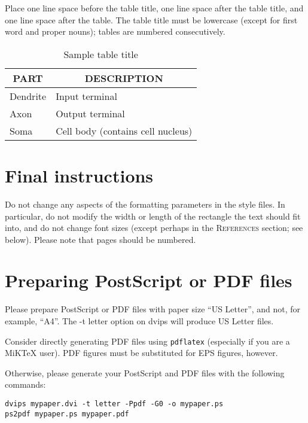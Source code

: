 \documentclass{article} %
\begin{document}
Place one line space before the table title, one line space after the table title, and one line space after the table. The table title must be lowercase (except for first word and proper nouns); tables are numbered consecutively.

\begin{table}[t]
\begin{center}
\begin{tabular}{ll}
\toprule
\multicolumn{1}{c}{\bf PART}  &\multicolumn{1}{c}{\bf DESCRIPTION} \\
\midrule
Dendrite         &Input terminal \\
Axon             &Output terminal \\
Soma             &Cell body (contains cell nucleus) \\
\bottomrule
\end{tabular}
\end{center}
\caption{Sample table title}\label{sample-table}
\end{table}




\section{Final instructions}
Do not change any aspects of the formatting parameters in the style files.
In particular, do not modify the width or length of the rectangle the text
should fit into, and do not change font sizes (except perhaps in the
\textsc{References} section; see below). Please note that pages should be
numbered.

\section{Preparing PostScript or PDF files}

Please prepare PostScript or PDF files with paper size ``US Letter'', and
not, for example, ``A4''. The -t
letter option on dvips will produce US Letter files.

Consider directly generating PDF files using \verb+pdflatex+
(especially if you are a MiKTeX user).
PDF figures must be substituted for EPS figures, however.

Otherwise, please generate your PostScript and PDF files with the following commands:
\begin{verbatim}
dvips mypaper.dvi -t letter -Ppdf -G0 -o mypaper.ps
ps2pdf mypaper.ps mypaper.pdf
\end{verbatim}
\end{document}
